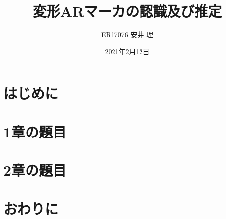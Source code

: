 \documentclass{graduation}
\begin{document}
\title{
変形ARマーカの認識及び推定
}
\author{ER17076 安井 理}
\date{2021年2月12日} %

\frontmatter
\maketitle

\setcounter{page}{1}
\chapter*{はじめに}
\label{chap:introduction}



\tableofcontents

\listoffigures
\listoftables


\mainmatter

\chapter{1章の題目}
\label{chap:1}


\chapter{2章の題目}
\label{chap:2}


\chapter*{おわりに}
\label{chap:10}




\end{document}
